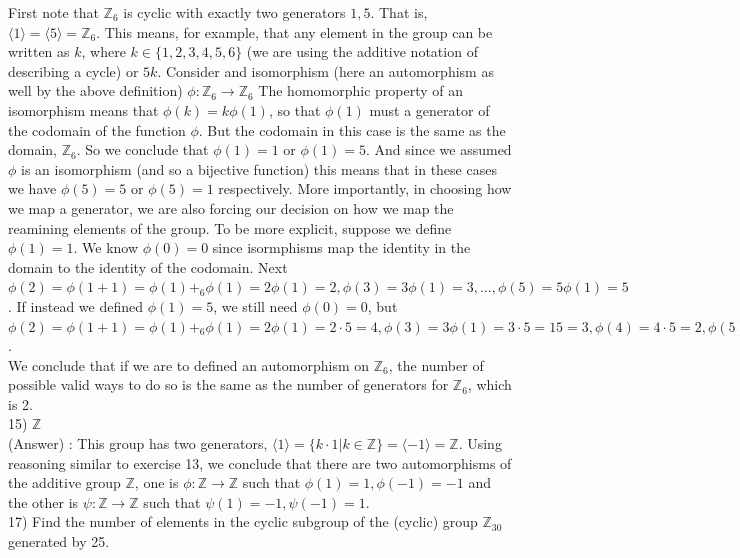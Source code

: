 \documentclass[12pt, letterpaper]{article}
\begin{document}
First note that $\mathbb{Z}_6$ is cyclic with exactly two generators $1,5$. That is, $\langle 1 \rangle = \langle 5 \rangle = \mathbb{Z}_6$. This means, for example, that any element in the group can be written as $k$, where $k \in \{1,2,3,4,5,6\}$ (we are using the additive notation of describing a cycle) or $5k$. Consider and isomorphism (here an automorphism as well by the above definition) $\phi : \mathbb{Z}_6 \rightarrow \mathbb{Z}_6$ The homomorphic property of an isomorphism means that $\phi(k) = k\phi(1)$, so that $\phi(1)$ must a generator of the codomain of the function $\phi$. But the codomain in this case is the same as the domain, $\mathbb{Z}_6$. So we conclude that $\phi(1) = 1$ or $\phi(1) = 5$. And since we assumed $\phi$ is an isomorphism (and so a bijective function) this means that in these cases we have $\phi(5) = 5$ or $\phi(5) = 1$ respectively. More importantly, in choosing how we map a generator, we are also forcing our decision on how we map the reamining elements of the group. To be more explicit, suppose we define $\phi(1) = 1$. We know $\phi(0) = 0$ since isormphisms map the identity in the domain to the identity of the codomain. Next $\phi(2) = \phi(1+1) = \phi(1) +_6 \phi(1) = 2\phi(1) = 2, \phi(3) = 3\phi(1) = 3,...,\phi(5) = 5\phi(1) = 5$. If instead we defined $\phi(1) = 5$, we still need $\phi(0) = 0$, but $\phi(2) = \phi(1+1)= \phi(1) +_6 \phi(1) = 2\phi(1) = 2 \cdot 5 = 4, \phi(3) = 3\phi(1) = 3\cdot 5 = 15 = 3, \phi(4) = 4 \cdot 5 = 2, \phi(5) = 5 \cdot 5 = 1$. \\

We conclude that if we are to defined an automorphism on $\mathbb{Z}_6$, the number of possible valid ways to do so is the same as the number of generators for $\mathbb{Z}_6$, which is 2. \\

15) $\mathbb{Z}$ \\

(Answer) : This group has two generators, $\langle 1 \rangle = \{k \cdot 1 | k \in \mathbb{Z} \} = \langle -1 \rangle = \mathbb{Z}$. Using reasoning similar to exercise 13, we conclude that there are two automorphisms of the additive group $\mathbb{Z}$, one is $\phi : \mathbb{Z} \rightarrow \mathbb{Z}$ such that $\phi(1) = 1, \phi(-1) = -1$ and the other is $\psi : \mathbb{Z} \rightarrow \mathbb{Z}$ such that $\psi(1) = -1, \psi(-1) = 1$. \\

17) Find the number of elements in the cyclic subgroup of the (cyclic) group $\mathbb{Z}_30$ generated by 25. \\
\end{document}
